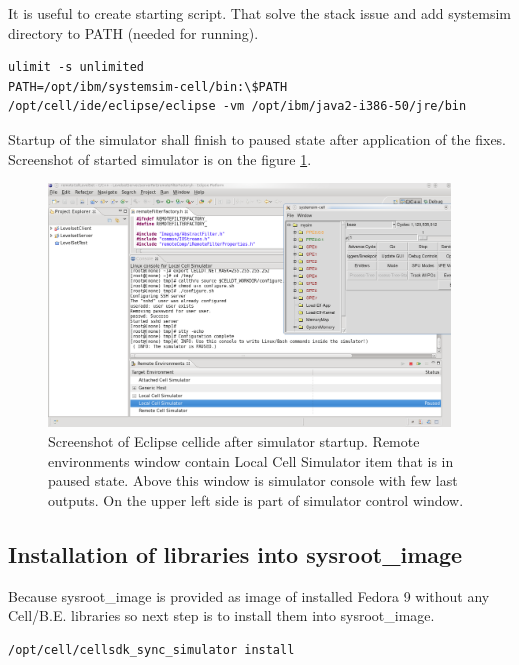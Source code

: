 It is useful to create starting script. That solve the stack issue and add systemsim directory to PATH (needed for running).

\begin{verbatim}
ulimit -s unlimited
PATH=/opt/ibm/systemsim-cell/bin:\$PATH
/opt/cell/ide/eclipse/eclipse -vm /opt/ibm/java2-i386-50/jre/bin
\end{verbatim}

Startup of the simulator shall finish to paused state after application of the fixes.
Screenshot of started simulator is on the figure \ref{fg:eclipseSIMStarted}.

\begin{figure}
    \centering
    \includegraphics[width=0.95\textwidth]{data/png/eclipseSIMStarted}
    \caption[Cellide with started simulator]{Screenshot of Eclipse cellide after simulator startup. Remote environments window contain Local Cell Simulator item that is in paused state. Above this window is simulator console with few last outputs. On the upper left side is part of simulator control window.}
    \label{fg:eclipseSIMStarted}
\end{figure}

\subsection{Installation of libraries into sysroot\_image}

Because sysroot\_image is provided as image of installed Fedora 9 without any \mbox{Cell/B.E.} libraries so next step is to install them into sysroot\_image.

\begin{verbatim}
/opt/cell/cellsdk_sync_simulator install
\end{verbatim}

